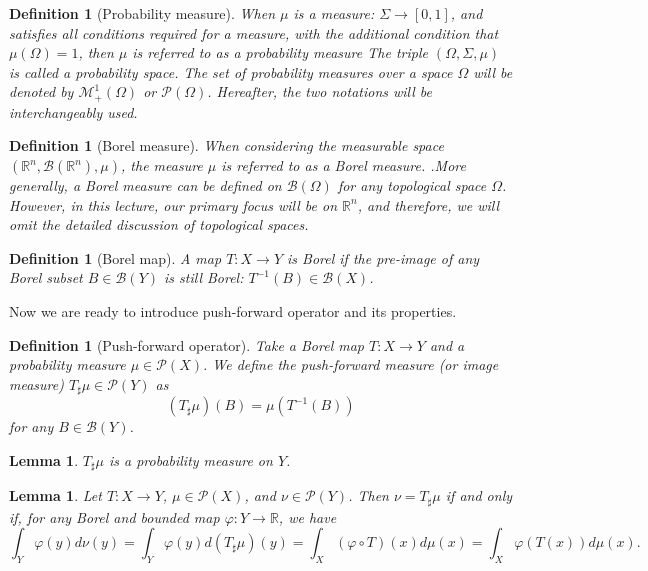 \documentclass[11pt]{book}
\newtheorem{lemma}[theorem]{Lemma}
\newtheorem{definition}[theorem]{Definition}
\begin{document}
\begin{definition}[Probability measure]
When $\mu$ is a measure: $\Sigma \to [0,1]$, and satisfies all conditions required for a measure, with the additional condition that $\mu(\Omega) = 1$, then $\mu$ is referred to as a probability measure The triple $(\Omega,\Sigma,\mu)$ is called a probability space. The set of probability measures over a space $\Omega$ will be denoted by $\mathcal{M}_+^1(\Omega)$ or $\mathcal{P}(\Omega)$. Hereafter, the two notations will be interchangeably used.
\end{definition}

\begin{definition}[Borel measure]
When considering the measurable space $(\mathbb{R}^n, \mathcal{B}(\mathbb{R}^n),\mu)$, the measure $\mu$ is referred to as a Borel measure. .More generally, a Borel measure can be defined on $\mathcal{B}(\Omega)$ for any topological space $\Omega$. However, in this lecture, our primary focus will be on $\mathbb{R}^n$, and therefore, we will omit the detailed discussion of topological spaces.
\end{definition}

\begin{definition}[Borel map]
A map $T: X \to Y$ is Borel if the pre-image of any Borel subset $B\in\mathcal{B}(Y)$ is still Borel: $T^{-1}(B) \in \mathcal{B}(X)$.
\end{definition}

Now we are ready to introduce push-forward operator and its properties.



\begin{definition}[Push-forward operator]
Take a Borel map \(T: X \rightarrow Y\) and a probability measure \(\mu \in \mathcal{P}(X)\). We define the push-forward measure (or  image measure) \(T_{\sharp}\mu \in \mathcal{P}(Y)\) as
\[
(T_\sharp\mu)(B) = \mu(T^{-1}(B))
\]
for any \(B \in \mathcal{B}(Y)\).
\end{definition}

\begin{lemma}
\(T_\sharp\mu\) is a probability measure on \(Y\).
\end{lemma}





\begin{lemma}\label{lemma:pushforward}
Let \(T: X \rightarrow Y\), \(\mu \in \mathcal{P}(X)\), and \( \nu \in \mathcal{P}(Y) \). Then \(\nu = T_\sharp \mu\)
if and only if, for any Borel and bounded map \(\varphi: Y \rightarrow \mathbb{R}\), we have
\[
\int_Y \varphi(y) d\nu(y) = \int_Y \varphi(y) d (T_{\sharp}\mu)(y) = \int_X (\varphi\circ T)(x) d\mu(x)= \int_X \varphi(T(x)) d\mu(x).
\]
\end{lemma}
\end{document}
